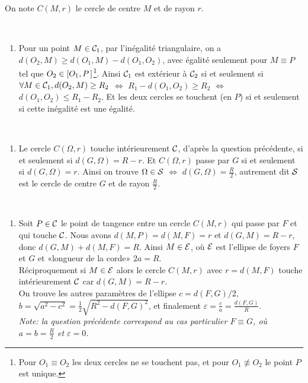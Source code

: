 \documentclass[a4paper,12pt,reqno]{amsart}
\begin{document}
\begin{solution}

  On note $C(M,r)$ le cercle de centre $M$ et de rayon $r$.

  ~
  \vspace{-17mm}

  \begin{enumerate}
    \item Pour un point $M \in \mathcal{C}_{1}$, par l'inégalité triangulaire, on a $d(O_{2},M) \geq d(O_{1},M) - d(O_{1},O_{2})$, avec égalité seulement pour $M\equiv P$ tel que $O_{2} \in [{O_{1},P}\kern.14em]$\footnote{Pour $O_{1}\equiv O_{2}$ les deux cercles ne se touchent pas, et pour $O_{1}\not\equiv O_{2}$ le point $P$ est unique.}. Ainsi $\mathcal{C}_{1}$ est extérieur à $\mathcal{C}_{2}$ si et seulement si $\forall M \in \mathcal{C}_{1}, d(O_{2},M) \geq R_{2}$ $\iff$ $R_{1} - d(O_{1},O_{2}) \geq R_{2}$ $\iff$ $d(O_{1},O_{2}) \leq R_{1}-R_{2}$. Et les deux cercles se touchent (en $P$) si et seulement si cette inégalité est une égalité.
  \end{enumerate}

  ~
  \vspace{-17mm}

  \begin{enumerate}[resume]
    \item Le cercle $C(\Omega,r)$ touche intérieurement $\mathcal{C}$, d'après la question précédente, si et seulement si $d(G,\Omega) = R-r$. Et $C(\Omega,r)$ passe par $G$ si et seulement si $d(G,\Omega) = r$. Ainsi on trouve $\Omega \in \mathcal{S}$ $\iff$ $d(G,\Omega) = \frac{R}{2}$, autrement dit $\mathcal{S}$ est le cercle de centre $G$ et de rayon $\frac{R}{2}$.
  \end{enumerate}

  ~
  \vspace{-17mm}

  \begin{enumerate}[resume]
    \item\label{ques:ell} Soit $P \in \mathcal{C}$ le point de tangence entre un cercle $C(M,r)$ qui passe par $F$ et qui touche $\mathcal{C}$. Nous avons $d(M,P) = d(M,F) = r$ et $d(G,M) = R-r$, donc $d(G,M) + d(M,F) = R$. Ainsi $M \in \mathcal{E}$, où $\mathcal{E}$ est l'ellipse de foyers $F$ et $G$ et «longueur de la corde» $2a = R$.\\
    Réciproquement si $M \in \mathcal{E}$ alors le cercle $C(M,r)$ avec $r = d(M,F)$ touche intérieurement $\mathcal{C}$ car $d(G,M) = R-r$.\\
    On trouve les autres paramètres de l'ellipse $c=d(F,G)/2$, $b=\sqrt{a^{2}-c^{2}} = \frac12\sqrt{R^{2}-d(F,G)^{2}}$, et finalement $\varepsilon = \frac{c}{a} = \frac{d(F,G)}{R}$.\\
    \emph{Note: la question précédente correspond au cas particulier $F\equiv G$, où $a=b=\frac{R}{2}$ et $\varepsilon = 0$.}
  \end{enumerate}


\end{solution}
\end{document}
